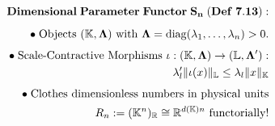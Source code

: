 \documentclass[preview]{standalone}
\begin{document}
\begin{align*}
\special{dvisvgm:raw <g id='unique000'>}\mathbf{Dimensional\;Parameter\;Functor\;S_n\;(Def\;7.13):}\\[5pt]\bullet\;\text{Objects }(\mathbb{K}, \mathbf{\Lambda})\text{ with }\mathbf{\Lambda}=\operatorname{diag}(\lambda_1,\dots,\lambda_n)>0.\\[4pt]\bullet\;\text{Scale-Contractive Morphisms }\iota:(\mathbb{K},\mathbf{\Lambda})\to(\mathbb{L},\mathbf{\Lambda}'):\\\;\;\lambda'_l\|\iota(x)\|_{\mathbb{L}} \le \lambda_l\|x\|_{\mathbb{K}}\\[4pt]\bullet\;\text{Clothes dimensionless numbers in physical units}\\\;\;R_n := (\mathbb{K}^n)_{\mathbb{R}} \cong \mathbb{R}^{d(\mathbb{K})n}\text{ functorially!}\special{dvisvgm:raw </g>}
\end{align*}
\end{document}
